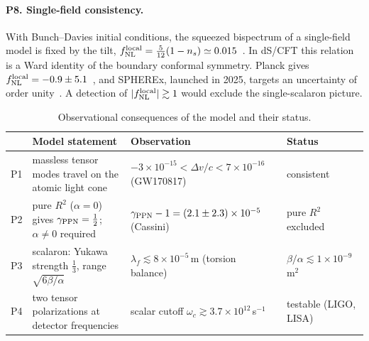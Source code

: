 \documentclass[reprint,aps,prd,amsmath,amssymb,superscriptaddress,nofootinbib,floatfix]{revtex4-2}
\theoremstyle{plain}
\theoremstyle{definition}
\theoremstyle{remark}
\begin{document}
\paragraph*{P8. Single-field consistency.} With Bunch--Davies initial conditions, the squeezed bispectrum of a
single-field model is fixed by the tilt, $f_{\rm NL}^{\rm local}=\tfrac{5}{12}(1-n_s)\simeq0.015$~\cite{Maldacena2003}. In dS/CFT this
relation is a Ward identity of the boundary conformal symmetry. Planck gives $f_{\rm NL}^{\rm local}=-0.9\pm5.1$~\cite{Planck2018NG},
and SPHEREx, launched in 2025, targets an uncertainty of order unity~\cite{SPHEREx2026}. A detection of
$|f_{\rm NL}^{\rm local}|\gtrsim1$ would exclude the single-scalaron picture.

\begin{table}[t]
\caption{\label{tab:predictions}Observational consequences of the model and their status.}
\begin{ruledtabular}
\begin{tabular}{llll}
\parbox[t]{0.04\textwidth}{\raggedright \strut} & \parbox[t]{0.30\textwidth}{\raggedright Model statement\strut} & \parbox[t]{0.36\textwidth}{\raggedright Observation\strut} & \parbox[t]{0.22\textwidth}{\raggedright Status\strut} \\
\hline
\parbox[t]{0.04\textwidth}{\raggedright P1\strut} & \parbox[t]{0.30\textwidth}{\raggedright massless tensor modes travel on the atomic light cone\strut} & \parbox[t]{0.36\textwidth}{\raggedright $-3\times10^{-15}<\Delta v/c<7\times10^{-16}$ (GW170817)~\cite{GW170817GRB}\strut} & \parbox[t]{0.22\textwidth}{\raggedright consistent\strut} \\
\parbox[t]{0.04\textwidth}{\raggedright P2\strut} & \parbox[t]{0.30\textwidth}{\raggedright pure $R^2$ ($\alpha=0$) gives $\gamma_{\rm PPN}=\tfrac12$; $\alpha\neq0$ required\strut} & \parbox[t]{0.36\textwidth}{\raggedright $\gamma_{\rm PPN}-1=(2.1\pm2.3)\times10^{-5}$ (Cassini)~\cite{Bertotti2003}\strut} & \parbox[t]{0.22\textwidth}{\raggedright pure $R^2$ excluded\strut} \\
\parbox[t]{0.04\textwidth}{\raggedright P3\strut} & \parbox[t]{0.30\textwidth}{\raggedright scalaron: Yukawa strength $\tfrac13$, range $\sqrt{6\beta/\alpha}$\strut} & \parbox[t]{0.36\textwidth}{\raggedright $\lambda_f\lesssim8\times10^{-5}$\,m (torsion balance)~\cite{Berry2011,Lee2020}\strut} & \parbox[t]{0.22\textwidth}{\raggedright $\beta/\alpha\lesssim1\times10^{-9}$\,m$^2$\strut} \\
\parbox[t]{0.04\textwidth}{\raggedright P4\strut} & \parbox[t]{0.30\textwidth}{\raggedright two tensor polarizations at detector frequencies\strut} & \parbox[t]{0.36\textwidth}{\raggedright scalar cutoff $\omega_c\gtrsim3.7\times10^{12}$\,s$^{-1}$~\cite{Berry2011}\strut} & \parbox[t]{0.22\textwidth}{\raggedright testable (LIGO, LISA)\strut} \\

\end{tabular}
\end{ruledtabular}
\end{table}
\end{document}
